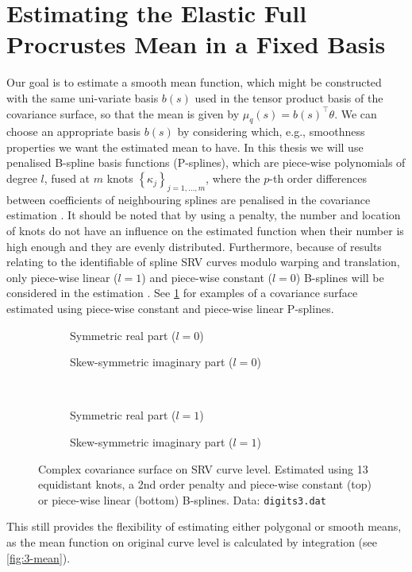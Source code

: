 \section{Estimating the Elastic Full Procrustes Mean in a Fixed Basis}
\label{sec:3-mean}
Our goal is to estimate a smooth mean function, which might be constructed with the same uni-variate basis $b(s)$ used in the tensor product basis of the covariance surface, so that the mean is given by $\mu_q(s) = b(s)^\top \theta$.
We can choose an appropriate basis $b(s)$ by considering which, e.g., smoothness properties we want the estimated mean to have.
In this thesis we will use penalised B-spline basis functions (P-splines), which are piece-wise polynomials of degree $l$, fused at $m$ knots $\left\{\kappa_j\right\}_{j=1,\dots,m}$, where the $p$-th order differences between coefficients of neighbouring splines are penalised in the covariance estimation \parencite[see][Chap.~8.1]{FahrmeierEtAl2013}.
It should be noted that by using a penalty, the number and location of knots do not have an influence on the estimated function when their number is high enough and they are evenly distributed.
Furthermore, because of results relating to the identifiable of spline SRV curves modulo warping and translation, only piece-wise linear ($l = 1$) and piece-wise constant ($l = 0$) B-splines will be considered in the estimation \parencite[see][]{Steyer2021}.
See \cref{fig:3-cov} for examples of a covariance surface estimated using piece-wise constant and piece-wise linear P-splines.
\begin{figure}[t]
  \centering
  \begin{subfigure}{.48\textwidth}
    \centering
    \caption{Symmetric real part ($l = 0$)}
  \end{subfigure}\hfill%
  \begin{subfigure}{.48\textwidth}
    \centering
    \caption{Skew-symmetric imaginary part ($l = 0$)}
  \end{subfigure}\vspace{0.66em}\\
  \begin{subfigure}{.48\textwidth}
    \centering
    \caption{Symmetric real part ($l = 1$)}
  \end{subfigure}\hfill%
  \begin{subfigure}{.48\textwidth}
    \centering
    \caption{Skew-symmetric imaginary part ($l =1$)}
  \end{subfigure}
  \caption{Complex covariance surface on SRV curve level. Estimated using 13 equidistant knots, a 2nd order penalty and piece-wise constant (top) or piece-wise linear (bottom) B-splines. Data: \texttt{digits3.dat}}
  \label{fig:3-cov}
\end{figure}
This still provides the flexibility of estimating either polygonal or smooth means, as the mean function on original curve level is calculated by integration (see \cref{fig:3-mean}). 


